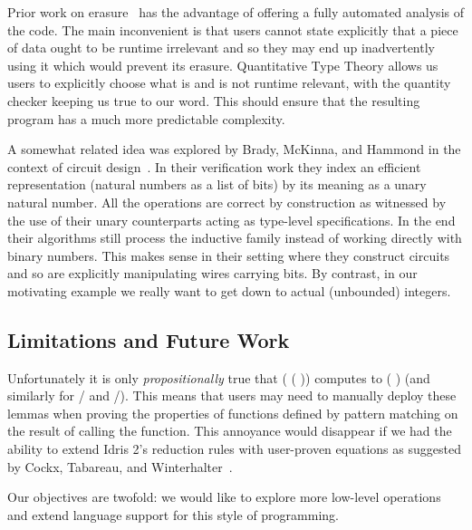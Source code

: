 \documentclass{article}
\newcommand{\idris}{Idris 2}
\begin{document}
Prior work on erasure~\cite{DBLP:journals/pacmpl/Tejiscak20} has the advantage of
offering a fully automated analysis of the code. The main inconvenient is that users
cannot state explicitly that a piece of data ought to be runtime irrelevant and so
they may end up inadvertently using it which would prevent its erasure.
%
Quantitative Type Theory allows us users to explicitly choose what is and is not
runtime relevant, with the quantity checker keeping us true to our word.
%
This should ensure that the resulting program has a much more predictable complexity.

A somewhat related idea was explored by Brady, McKinna, and Hammond in the context of
circuit design~\cite{DBLP:conf/sfp/BradyMH07}. In their verification work they index
an efficient representation (natural numbers as a list of bits) by its meaning as a
unary natural number. All the operations are correct by construction as witnessed by
the use of their unary counterparts acting as type-level specifications.
%
In the end their algorithms still process the inductive family instead of working
directly with binary numbers. This makes sense in their setting where they construct
circuits and so are explicitly manipulating wires carrying bits.
%
By contrast, in our motivating example we really want to get down to actual (unbounded)
integers.


\subsection{Limitations and Future Work}

Unfortunately it is only \emph{propositionally} true that
( (  ))
computes to (  ) (and similarly for
/ and /).
%
This means that users may need to manually deploy these lemmas when proving the
properties of functions defined by pattern matching on the result of calling the
 function.
%
This annoyance would disappear if we had the ability to extend \idris{}'s reduction rules
with user-proven equations as suggested by Cockx, Tabareau, and
Winterhalter~\cite{DBLP:journals/pacmpl/CockxTW21}.

Our objectives are twofold: we would like to explore more low-level operations and
extend language support for this style of programming.
\end{document}
